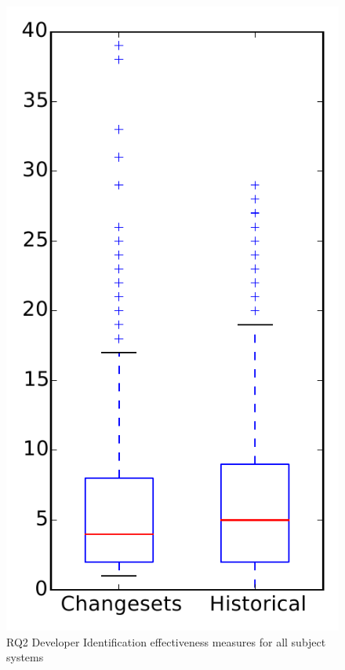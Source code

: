 
\begin{figure}
\centering
\includegraphics[height=0.4\textheight]{figures/dit/rq2_overview}
\caption{RQ2 Developer Identification effectiveness measures for all subject systems}
\label{fig:dit:rq2:overview}
\end{figure}
